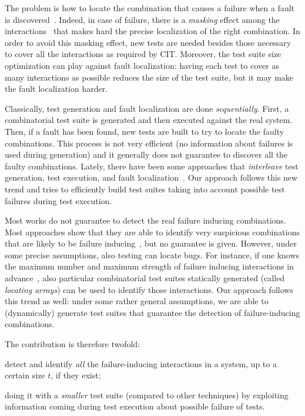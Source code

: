 \begin{tikzborder}{\cite{Gargantini16:validation}}
\begin{tikzborder}{\cite{gargantini_combinatorial_2017}}
\begin{tikzborder}{\cite{garn2019}}
\begin{tikzborder}{\cite{arcaini2019achieving}}
The problem is how to locate the combination that causes a failure when a fault is discovered~\cite{Niu2018Identifying,Niu2018interleaving}. Indeed, in case of failure, there is a \emph{masking} effect among the interactions~\cite{Niu2018Identifying} that makes hard the precise localization of the right combination. In order to avoid this masking effect, new tests are needed besides those necessary to cover all the interactions as required by CIT. Moreover, the test suite size optimization can play against fault localization: having each test to cover as many interactions as possible reduces the size of the test suite, but it may make the fault localization harder.

Classically, test generation and fault localization are done \emph{sequentially}. First, a combinatorial test suite is generated and then executed against the real system. Then, if a fault has been found, new tests are built to try to locate the faulty combinations. This process is not very efficient (no information about failures is used during generation) and it generally does not guarantee to discover all the faulty combinations. Lately, there have been some approaches that \emph{interleave} test generation, test execution, and fault localization~\cite{Niu2018interleaving}. Our approach follows this new trend and tries to efficiently build test suites taking into account possible test failures during test execution.

Most works do not guarantee to detect the real failure inducing combinations. Most approaches show that they are able to identify very suspicious combinations that are likely to be failure inducing~\cite{ben_2015}, but no guarantee is given. However, under some precise assumptions, also testing can locate bugs. For instance, if one knows the maximum number and maximum strength of failure inducing interactions in advance~\cite{colbourn_locating_2008}, also particular combinatorial test suites statically generated (called {\it locating arrays}) can be used to identify those interactions. Our approach follows this trend as well: under some rather general assumptions, we are able to (dynamically) generate test suites that guarantee the detection of failure-inducing combinations.

The contribution is therefore twofold:
%
\begin{compactenum}
	\item detect and identify \textit{all} the failure-inducing interactions in a system, up to a certain size $t$, if they exist;
	\item doing it with a \textit{smaller} test suite (compared to other techniques) by exploiting information coming during test execution about possible failure of tests.
\end{compactenum}


\end{tikzborder}
\end{tikzborder}
\end{tikzborder}
\end{tikzborder}
